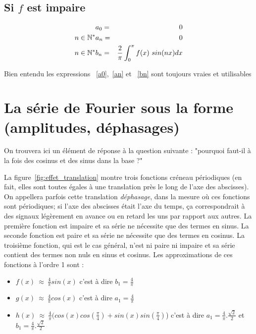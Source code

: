 \subsection{Si $f$ est impaire}
\begin{eqnarray}
& a_0=&0\label{aimpaire0}\\
n\in \mathbb{N}^* & a_n=&0  \label{animpaire}\\
n\in \mathbb{N}^* & b_n=& \frac{2}{\pi}\int_{0}^{\pi}f(x)\ sin(nx) dx \label{bnimpaire}
\end{eqnarray}

Bien entendu les expressions ~\ref{a0},~\ref{an} et ~\ref{bn} sont
toujours vraies et utilisables

\section{La série de Fourier sous la forme (amplitudes, déphasages)}

On trouvera ici un élément de réponse à la question suivante : "pourquoi faut-il à la fois des cosinus et des sinus dans la base ?"

La figure~\ref{fig:effet_translation} montre trois fonctions créneau périodiques (en fait, elles sont toutes égales à une translation près le long de l'axe des abscisses). On appellera parfois cette translation \emph{déphasage}, dans la mesure où ces fonctions sont périodiques; si l'axe des abscisses était l'axe du temps, ça correspondrait à des signaux légèrement en avance ou en retard les uns par rapport aux autres. La première fonction est impaire et sa série ne nécessite que des termes en sinus. La seconde fonction est paire et sa série ne nécessite que des termes en cosinus. La troisième fonction, qui est le cas général, n'est ni paire ni impaire et sa série contient des termes non nuls en sinus et cosinus. Les approximations de ces fonctions à l'ordre 1 sont :

\begin{itemize}
  \item $f(x) ~ \approx ~\frac{4}{\pi}sin(x)$ c'est à dire $b_1=\frac{4}{\pi}$
  \item $g(x) ~ \approx ~ \frac{4}{\pi}cos(x)$ c'est à dire $a_1=\frac{4}{\pi}$
  \item $h(x) ~ \approx ~ \frac{4}{\pi}\Big(cos(x)cos(\frac{\pi}{4})+sin(x)sin(\frac{\pi}{4})$\Big)  c'est à dire $a_1=\frac{4}{\pi}.\frac{\sqrt 2}{2}$ et $b_1=\frac{4}{\pi}.\frac{\sqrt 2 }{2}$
\end{itemize}

